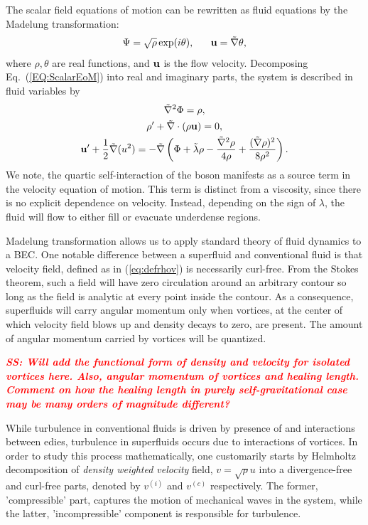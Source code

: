\documentclass[onecolumn,nofootinbib,superscriptaddress]{revtex4}
\newcommand{\stst}[1]{\textcolor{red}{\it{\textbf{SS: #1}}} }
\begin{document}
The scalar field equations of motion can be rewritten as fluid equations by the Madelung transformation:
\begin{equation}
\label{eq:defrhov}
\Psi = \sqrt{\rho}\exp(i\theta), \;\;\;\;\;\; {\bf{u}} = \tilde{\nabla}\theta,
\end{equation}
where $\rho, \theta$ are real functions, and ${\bf{u}}$ is the flow velocity.  Decomposing Eq.~(\ref{EQ:ScalarEoM}) into real and imaginary parts, the system is described in fluid variables by
\begin{gather}
\tilde{\nabla}^2\Phi = \rho,\\
\rho' + \tilde{\nabla}\cdot(\rho {\bf{u}}) = 0,\\
{\bf{u}}' + \frac{1}{2}\tilde{\nabla}(u^2) = -\tilde{\nabla}\left(\Phi + \tilde{\lambda}\rho - \frac{\tilde{\nabla}^2\rho}{4\rho}+\frac{(\tilde{\nabla}\rho)^2}{8\rho^2}\right).
\end{gather}
We note, the quartic self-interaction of the boson manifests as a source term in the velocity equation of motion.  This term is distinct from a viscosity, since there is no explicit dependence on velocity.  Instead, depending on the sign of $\lambda$, the fluid will flow to either fill or evacuate underdense regions.

Madelung transformation allows us to apply standard theory of fluid dynamics to a BEC. One notable difference between a superfluid and conventional fluid is that velocity field, defined as in (\ref{eq:defrhov}) is necessarily curl-free. From the Stokes theorem, such a field will have zero circulation around an arbitrary contour so long as the field is analytic at every point inside the contour. As a consequence, superfluids will carry angular momentum only when vortices, at the center of which velocity field blows up and density decays to zero, are present. The amount of angular momentum carried by vortices will be quantized. 

\stst{Will add the functional form of density and velocity for isolated vortices here. Also, angular momentum of vortices and healing length. Comment on how the healing length in purely  self-gravitational case may be many orders of magnitude different?}

While turbulence in conventional fluids is driven by presence of and interactions between edies, turbulence in superfluids occurs due to interactions of vortices. In order to study this process mathematically, one customarily starts by Helmholtz decomposition of \textit{density weighted velocity} field, $v = \sqrt{\rho} u$ into a divergence-free and curl-free parts, denoted by $v^{(i)}$ and $v^{(c)}$ respectively. The former, 'compressible' part, captures the motion of mechanical waves in the system, while the latter, 'incompressible' component is responsible for turbulence. 
\end{document}
